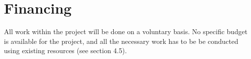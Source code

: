 \section{Financing}
All work within the project will be done on a voluntary basis. No specific budget is available for the project, and all the necessary work has to be be conducted using existing resources (see section 4.5).